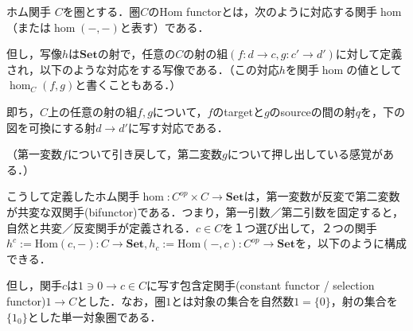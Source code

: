 \documentclass[uplatex, dvipdfmx]{jsreport}
\begin{document}
\begin{definition}{ホム関手}\rm{}
    $C$を圏とする．圏$C$の\textrm{Hom functor}とは，次のように対応する関手$\hom$（または$\hom(-,-)$と表す）である．
    \begin{center}\end{center}
    但し，写像$h$は$\mathbf{Set}$の射で，任意の$C$の射の組$(f:d\to c, g:c'\to d')$に対して定義され，以下のような対応をする写像である．（この対応$h$を関手$\hom$の値として$\hom_C(f,g)$と書くこともある．）
    \begin{center}\end{center}
    即ち，$C$上の任意の射の組$f,g$について，$f$のtargetと$g$のsourceの間の射$q$を，下の図を可換にする射$d\to d'$に写す対応である．
    \begin{center}\end{center}
    （第一変数$f$について引き戻して，第二変数$g$について押し出している感覚がある．）
\end{definition}

こうして定義したホム関手$\hom:C^{op}\times C\to \mathbf{Set}$は，第一変数が反変で第二変数が共変な双関手(bifunctor)である．つまり，第一引数／第二引数を固定すると，自然と共変／反変関手が定義される．$c\in C$を１つ選び出して，２つの関手$h^c:=\mathrm{Hom}(c,-):C\to\mathbf{Set},h_c:=\mathrm{Hom}(-,c):C^{op}\to\mathbf{Set}$を，以下のように構成できる．
\begin{center}\end{center}
但し，関手$c$は$1\ni 0\to c\in C$に写す包含定関手(constant functor / selection functor)$1\to C$とした．なお，圏$1$とは対象の集合を自然数$1=\{ 0\}$，射の集合を$\{ 1_0\}$とした単一対象圏である．
\end{document}
